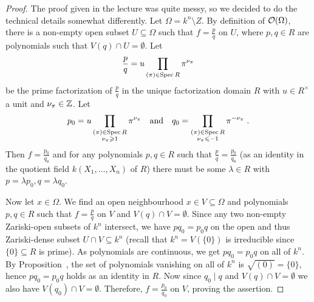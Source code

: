 \documentclass[a4paper,parskip=half,numbers=enddot, DIV=12]{scrreprt}
\renewcommand{\geq}{\geqslant}
\renewcommand{\leq}{\leqslant}
\begin{document}
	\begin{proof} 
		The proof given in the lecture was quite messy, so we decided to do the technical details somewhat differently. Let $\Omega= k^n\setminus Z$. By definition of $\mathcal{O}(\Omega)$, there is a non-empty open subset $U\subseteq\Omega$ such that $f=\frac pq$ on $U$, where $p,q\in R$ are polynomials such that $V(q)\cap U=\emptyset$. Let
		\begin{align*}
			\frac pq=u\prod_{(\pi)\in\operatorname{Spec} R} \pi^{\nu_\pi}
		\end{align*}
		be the prime factorization of $\frac pq$ in the unique factorization domain $R$ with $u\in R^\times$ a unit and $\nu_\pi\in\mathbb{Z}$. Let
		\begin{align*}
			p_0=u\prod_{\substack{(\pi)\in\Spec R\\\nu_\pi\geq 1}}\pi^{\nu_\pi}\quad\text{and}\quad q_0=\prod_{\substack{(\pi)\in\Spec R\\\nu_\pi\leq -1}}\pi^{-\nu_\pi}\;.
		\end{align*}
		Then $f=\frac{p_0}{q_0}$ and for any polynomials $p,q\in R$ such that $\frac pq=\frac{p_0}{q_0}$ (as an identity in the quotient field $k(X_1,\ldots,X_n)$ of $R$) there must be some $\lambda\in R$ with $p=\lambda p_0,q=\lambda q_0$.
		
		Now let $x\in\Omega$. We find an open neighbourhood $x\in V\subseteq \Omega$ and polynomials $p,q\in R$ such that $f=\frac pq$ on $V$ and $V(q)\cap V=\emptyset$. Since any two non-empty Zariski-open subsets of $k^n$ intersect, we have $pq_0=p_0q$ on the open and thus Zariski-dense subset $U\cap V\subseteq k^n$ (recall that $k^n=V\left(\{0\}\right)$ is irreducible since $\{0\}\subseteq R$ is prime). As polynomials are continuous, we get $pq_0=p_0q$ on all of $k^n$. By Proposition~, the set of polynomials vanishing on all of $k^n$ is $\sqrt{(0)}=\{0\}$, hence $pq_0=p_0q$ holds as an identity in $R$. Now since $q_0\mid q$ and $V(q)\cap V=\emptyset$ we also have $V(q_0)\cap V=\emptyset$. Therefore, $f=\frac{p_0}{q_0}$ on $V$, proving the assertion.
	\end{proof}
\end{document}
